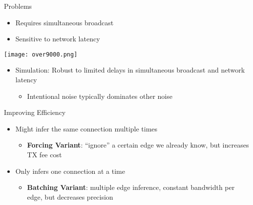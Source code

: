 \documentclass{beamer}
\begin{document}
\begin{frame}{Problems}
\begin{itemize}
    \item Requires simultaneous broadcast\pause
    \item Sensitive to network latency\pause
\end{itemize}
\begin{center}\texttt{[image: over9000.png]}\end{center}\pause
\begin{itemize}
    \item Simulation: Robust to limited delays in simultaneous broadcast and network latency\pause
    \begin{itemize}
    \item Intentional noise typically dominates other noise
    \end{itemize}
\end{itemize}
\end{frame}

\begin{frame}{Improving Efficiency}
\begin{itemize}
    \item Might infer the same connection multiple times\pause
    \begin{itemize}
        \item \textbf{Forcing Variant}: ``ignore'' a certain edge we already know, but increases TX fee cost
    \end{itemize}\pause
    \item Only infers one connection at a time\pause
    \begin{itemize}
        \item \textbf{Batching Variant}: multiple edge inference, constant bandwidth per edge, but decreases precision
    \end{itemize}
\end{itemize}
\end{frame}
\end{document}
